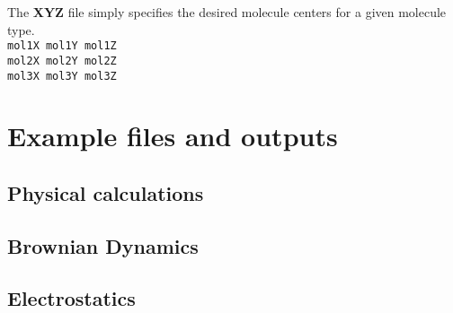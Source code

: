 \medskip
\medskip
\medskip
\medskip

The \textbf{XYZ} file simply specifies the desired molecule centers for a given molecule type. \\

\texttt{mol1X  mol1Y  mol1Z }\\
\texttt{mol2X  mol2Y  mol2Z }\\
\texttt{mol3X  mol3Y  mol3Z }\\

\clearpage



\chapter{Example files and outputs}

\section{Physical calculations}



\section{Brownian Dynamics}




\section{Electrostatics}















